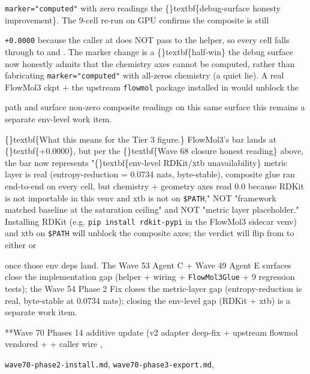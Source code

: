 \documentclass{article}
\begin{document}
\texttt{marker="computed"} with zero readings  the \{\}textbf\{debug-surface honesty improvement\}. The 9-cell re-run on GPU confirms the composite is still

\texttt{+0.0000} because the caller at  does NOT pass  to the helper, so every cell falls through to  and . The marker change is a \{\}textbf\{half-win\}  the debug surface now honestly admits that the chemistry axes cannot be computed, rather than fabricating \texttt{marker="computed"} with all-zeros chemistry (a quiet lie). A real FlowMol3 ckpt + the upstream \texttt{flowmol} package installed in  would unblock the

 path and surface non-zero composite readings on this same surface  this remains a separate env-level work item.

\{\}textbf\{What this means for the Tier 3 figure.\} FlowMol3's bar lands at \{\}textbf\{+0.0000\}, but per the \{\}textbf\{Wave 68 closure honest reading\} above, the bar now represents "\{\}textbf\{env-level RDKit/xtb unavailability\}  metric layer is real (entropy-reduction = 0.0734 nats, byte-stable), composite glue ran end-to-end on every cell, but chemistry + geometry axes read 0.0 because RDKit is not importable in this venv and xtb is not on \texttt{\$PATH}," NOT "framework matched baseline at the saturation ceiling" and NOT "metric layer placeholder." Installing RDKit (e.g. \texttt{pip install rdkit-pypi} in the FlowMol3 sidecar venv) and xtb on \texttt{\$PATH} will unblock the composite axes; the verdict will flip from  to either  or

 once those env deps land. The Wave 53 Agent C + Wave 49 Agent E surfaces close the implementation gap (helper + wiring + \texttt{FlowMol3Glue} + 9 regression tests); the Wave 54 Phase 2 Fix closes the metric-layer gap (entropy-reduction is real, byte-stable at 0.0734 nats); closing the env-level gap (RDKit + xtb) is a separate work item.

**Wave 70 Phases 14 additive update (v2 adapter deep-fix + upstream flowmol vendored +  + caller wire  ,

\texttt{wave70-phase2-install.md}, \texttt{wave70-phase3-export.md},
\end{document}
